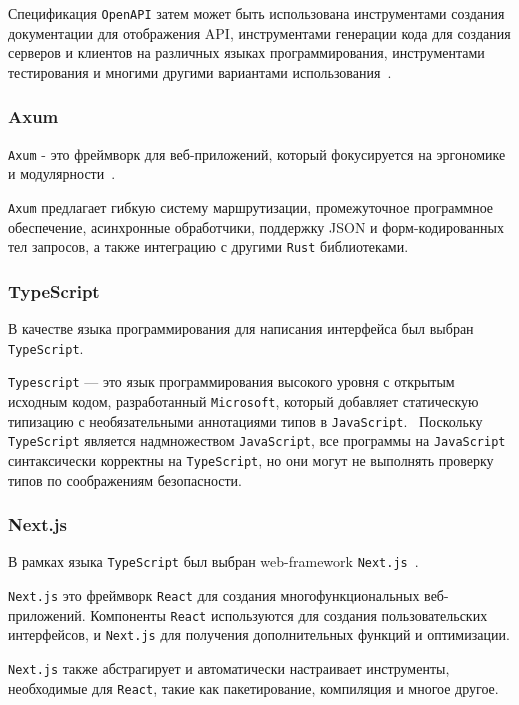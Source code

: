 Спецификация \texttt{OpenAPI} затем может быть использована инструментами создания документации для отображения API, инструментами генерации кода для создания серверов и клиентов на различных языках программирования, инструментами тестирования и многими другими вариантами использования~\cite{openapi}.

\subsubsection{Axum}

\texttt{Axum} - это фреймворк для веб-приложений, который фокусируется на эргономике и модулярности~\cite{axum}.

\texttt{Axum} предлагает гибкую систему маршрутизации, промежуточное программное обеспечение, асинхронные обработчики, поддержку JSON и форм-кодированных тел запросов, а также интеграцию с другими \texttt{Rust} библиотеками.

\subsubsection{TypeScript}
В качестве языка программирования для написания интерфейса был выбран \texttt{TypeScript}.

\texttt{Typescript} --- это язык программирования высокого уровня с открытым исходным кодом, разработанный \texttt{Microsoft}, который добавляет статическую типизацию с необязательными аннотациями типов в \texttt{JavaScript}.~\cite{TypeScript}
Поскольку \texttt{TypeScript} является надмножеством \texttt{JavaScript}, все программы на \texttt{JavaScript} синтаксически корректны на \texttt{TypeScript}, но они могут не выполнять проверку типов по соображениям безопасности.

\subsubsection{Next.js}

В рамках языка \texttt{TypeScript} был выбран web-framework \texttt{Next.js}~\cite{nextjs}.

\texttt{Next.js} это фреймворк \texttt{React} для создания многофункциональных веб-приложений. 
Компоненты \texttt{React} используются для создания пользовательских интерфейсов, и \texttt{Next.js} для получения дополнительных функций и оптимизации.

\texttt{Next.js} также абстрагирует и автоматически настраивает инструменты, необходимые для \texttt{React}, такие как пакетирование, компиляция и многое другое. 

